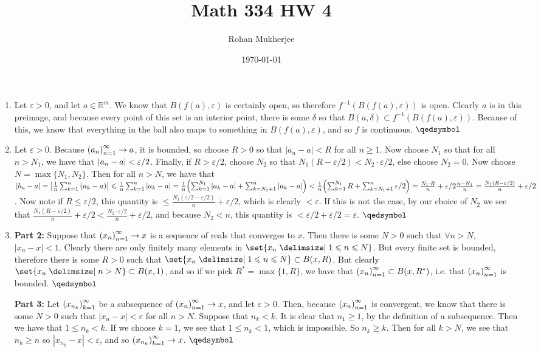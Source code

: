 \documentclass[12pt]{article}
\title{Math 334 HW 4}
\date{\today}
\author{Rohan Mukherjee}
\theoremstyle{definition}
\theoremstyle{remark}
\newcommand{\R}{\mathbb{R}}
\newcommand{\ve}{\varepsilon}
\renewcommand{\qed}{\hfill\qedsymbol}
\newcommand{\seq}[2]{\qty(#1_#2)_{#2=1}^{\infty}}
\renewcommand{\geq}{\geqslant}
\renewcommand{\leq}{\leqslant}
\begin{document}
	\maketitle
	\begin{enumerate}[leftmargin=\labelsep]
		\item Let $\ve > 0$, and let $a \in \R^m$. We know that $B(f(a), \ve)$ is certainly open, so therefore $f^{-1}(B(f(a), \ve))$ is open. Clearly $a$ is in this preimage, and because every point of this set is an interior point, there is some $\delta$ so that $B(a, \delta) \subset f^{-1}(B(f(a), \ve))$. Because of this, we know that everything in the ball also maps to something in $B(f(a), \ve)$, and so $f$ is continuous. $\qed$
		
		\item
		Let $\ve > 0$. Because $\seq{a}{n} \to a$, it is bounded, so choose $R > 0$ so that $|a_n-a| < R$ for all $n \geq 1$. Now choose $N_1$ so that for all $n > N_1$, we have that $\qty|a_n - a| < \ve/2$. Finally, if $R > \ve/2$, choose $N_2$ so that $N_1(R-\ve/2) < N_2 \cdot \ve/2$, else choose $N_2 = 0$. Now choose $N = \max\{N_1, N_2\}$. Then for all $n > N$, we have that $\qty|b_n - a| = \qty|\frac 1n \sum_{k=1}^{n} \qty(a_k - a)| \leq \frac 1n \sum_{k=1}^{n} |a_k-a| = \frac 1n \qty(\sum_{k=1}^{N_1} |a_k-a| + \sum_{k=N_1+1}^{n}|a_k-a|) < \frac 1n \qty(\sum_{k=1}^{N_1} R + \sum_{k=N_1+1}^{n} \ve/2) = \frac{N_1 \cdot R}{n} + \ve/2 \frac{n - N_1}{n} = \frac{N_1(R-\ve/2)}{n} + \ve/2$. Now note if $R \leq \ve/2$, this quantity is $\leq \frac{N_1(\ve/2 - \ve/2)}{n}+\ve/2$, which is clearly $< \ve$. If this is not the case, by our choice of $N_2$ we see that $\frac{N_1(R-\ve/2)}{n} + \ve/2 < \frac{N_2\cdot \ve/2}{n} + \ve/2$, and because $N_2 < n$, this quantity is $< \ve/2 + \ve/2 = \ve$.  $\hfill \qed$
		
		\item 
		
		\textbf{Part 2:} Suppose that $\seq{x}{n} \to x$ is a sequence of reals that converges to $x$. Then there is some $N > 0$ such that $\forall n > N$, $|x_n-x| < 1$. Clearly there are only finitely many elements in $\set{x_n \given 1 \leq n \leq N}$. But every finite set is bounded, therefore there is some $R > 0$ such that $\set{x_n \given 1 \leq n \leq N} \subset B(x, R)$. But clearly $\set{x_n \given n > N} \subset B(x, 1)$, and so if we pick $R^* = \max\{1, R\}$, we have that $\seq{x}{n} \subset B(x, R^*)$, i.e. that $\seq{x}{n}$ is bounded. $\qed$
		
		\textbf{Part 3:} Let $\qty(x_{n_k})_{k=1}^{\infty}$ be a subsequence of $\seq{x}{n} \to x$, and let $\ve > 0$. Then, because $\seq{x}{n}$ is convergent, we know that there is some $N > 0$ such that $|x_n-x| < \ve$ for all $n > N$. Suppose that $n_k < k$. It is clear that $n_1 \geq 1$, by the definition of a subsequence. Then we have that $1 \leq n_k < k$. If we choose $k=1$, we see that $1 \leq n_k < 1$, which is impossible. So $n_k \geq k$. Then for all $k > N$, we see that $n_k \geq n$ so $|x_{n_k} - x| < \ve$, and so $\qty(x_{n_k})_{k=1}^{\infty} \to x$. $\qed$
		

\end{enumerate}
\end{document}
